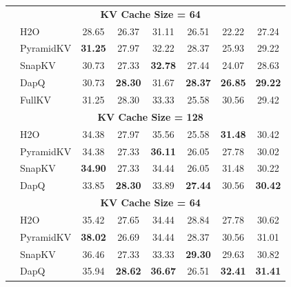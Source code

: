 \begin{table}[t]
\begin{tabular}{>{\bfseries}c l *{6}{c}}
& \multicolumn{7}{c}{\cellcolor{gray!20}\textbf{KV Cache Size = 64}} \\
& H2O & 28.65 & 26.37 & 31.11 & 26.51 & 22.22 & 27.24 \\
& PyramidKV & \textbf{31.25} & 27.97 & 32.22 & 28.37 & 25.93 & 29.22 \\
& SnapKV & 30.73 & 27.33 & \textbf{32.78} & 27.44 & 24.07 & 28.63 \\
& DapQ & 30.73 & \textbf{28.30} & 31.67 & \textbf{28.37} & \textbf{26.85} & \textbf{29.22} \\
\midrule
\multirow{11}{*}{\makecell[c]{Qwen3-8B}} & FullKV & 31.25 & 28.30 & 33.33 & 25.58 & 30.56 & 29.42 \\
& \multicolumn{7}{c}{\cellcolor{gray!20}\textbf{KV Cache Size = 128}} \\
& H2O & 34.38 & 27.97 & 35.56 & 25.58 & \textbf{31.48} & 30.42 \\
& PyramidKV & 34.38 & 27.33 & \textbf{36.11} & 26.05 & 27.78 & 30.02 \\
& SnapKV & \textbf{34.90} & 27.33 & 34.44 & 26.05 & 31.48 & 30.22 \\
& DapQ & 33.85 & \textbf{28.30} & 33.89 & \textbf{27.44} & 30.56 & \textbf{30.42} \\
& \multicolumn{7}{c}{\cellcolor{gray!20}\textbf{KV Cache Size = 64}} \\
& H2O & 35.42 & 27.65 & 34.44 & 28.84 & 27.78 & 30.62 \\
& PyramidKV & \textbf{38.02} & 26.69 & 34.44 & 28.37 & 30.56 & 31.01 \\
& SnapKV & 36.46 & 27.33 & 33.33 & \textbf{29.30} & 29.63 & 30.82 \\
& DapQ & 35.94 & \textbf{28.62} & \textbf{36.67} & 26.51 & \textbf{32.41} & \textbf{31.41} \\
\bottomrule
\end{tabular}
\label{table:longbenchv2}
\end{table}


